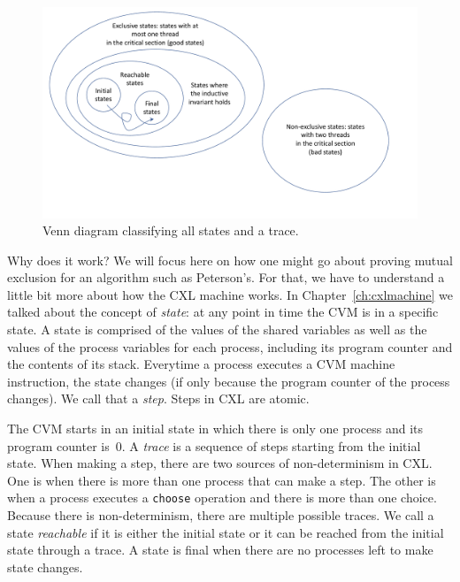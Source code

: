 \documentclass{report}
\begin{document}
\begin{figure}
\begin{center}
\includegraphics[width=6in]{figures/states-crop.pdf}
\end{center}
\caption{Venn diagram classifying all states and a trace.}
\label{fig:states}
\end{figure}

Why does it work?  We will focus here on how one might go about proving
mutual exclusion for an algorithm such as Peterson's.
For that, we have to understand a little bit more about how the CXL
machine works.
In Chapter~\ref{ch:cxlmachine} we talked about the concept of \emph{state}:
at any point in time the CVM is in a specific state.
A state is comprised of the values of the shared variables as well as
the values of the process variables
for each process, including its
program counter and the contents of its stack.
Everytime a process executes a CVM machine instruction, the
state changes (if only because the program counter of the process
changes).  We call that a \emph{step}.
Steps in CXL are atomic.

The CVM starts in an initial state in which there is only
one process and its program counter is~0.  A \emph{trace}
is a sequence of steps starting from the initial state.
When making a step, there are two sources of non-determinism
in CXL.
One is when
there is more than one process that can make a step.  The other is
when a process executes a \texttt{choose} operation and there is
more than one choice.
Because there is non-determinism, there are multiple possible traces.
We call a state \emph{reachable}
if it is either the initial state
or it can be reached from the initial state through a trace.
A state is final
when there are no processes left to make state changes.
\end{document}
